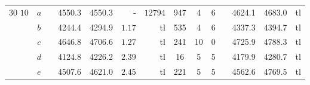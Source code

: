 \begin{table}[!htb]
\begin{tabular}{cccccrrccccccr}
\hline
\multirow{5}{*}{$30$  \hspace{4mm} $10$}
& $a$ & & 4550.3 & 4550.3 & - & $12794$ & 947 & 4 & 6 & & 4624.1 & 4683.0 & tl \\
& $b$ & & 4244.4 & 4294.9 & $1.17$ & tl & 535 & 4 & 6 & & 4337.3 & 4394.7 & tl \\
& $c$ & & 4646.8 & 4706.6 & $1.27$ & tl & 241 & 10 & 0 & & 4725.9 & 4788.3 & tl \\
& $d$ & & 4124.8 & 4226.2 & $2.39$ & tl & 16 & 5 & 5 & & 4179.9 & 4280.7 & tl \\
& $e$ & & 4507.6 & 4621.0 & $2.45$ & tl & 221 & 5 & 5 & & 4562.6 & 4769.5 & tl \\
\hline
\end{tabular}
\label{tab:PDPCDxVRPCD-custo0}
\end{table}
